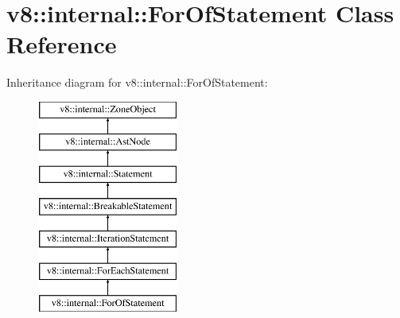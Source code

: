\hypertarget{classv8_1_1internal_1_1_for_of_statement}{}\section{v8\+:\+:internal\+:\+:For\+Of\+Statement Class Reference}
\label{classv8_1_1internal_1_1_for_of_statement}
Inheritance diagram for v8\+:\+:internal\+:\+:For\+Of\+Statement\+:\begin{figure}[H]
\begin{center}
\leavevmode
\includegraphics[height=7.000000cm]{classv8_1_1internal_1_1_for_of_statement}
\end{center}
\end{figure}
